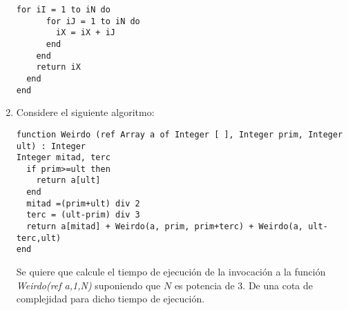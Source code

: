 \begin{enumerate}
\begin{lstlisting}[upquote=true, language=pseudo]
    for iI = 1 to iN do
      for iJ = 1 to iN do
        iX = iX + iJ
      end
    end
    return iX
  end
end
\end{lstlisting}
\item Considere el siguiente algoritmo:
\begin{lstlisting}[upquote=true, language=pseudo]
function Weirdo (ref Array a of Integer [ ], Integer prim, Integer ult) : Integer 
Integer mitad, terc
  if prim>=ult then 
    return a[ult] 
  end
  mitad =(prim+ult) div 2
  terc = (ult-prim) div 3
  return a[mitad] + Weirdo(a, prim, prim+terc) + Weirdo(a, ult-terc,ult)
end
\end{lstlisting}
Se quiere que calcule el tiempo de ejecución de la invocación a la función \textit{Weirdo(ref a,1,N)} suponiendo que $N$ es potencia de 3. De una cota de complejidad para dicho tiempo de ejecución.
\end{enumerate}
